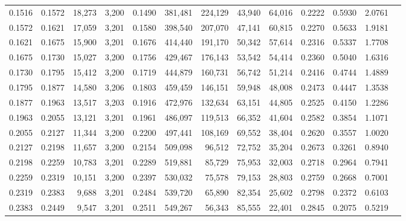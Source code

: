 \begin{tabular}{rrrrrrrrrrrrr}
0.1516 & 0.1572 & 18,273 & 3,200 &                                     0.1490 & 381,481 & 224,129 &  43,940 &  64,016 & 0.2222 & 0.5930 & 2.0761 \\
0.1572 & 0.1621 & 17,059 & 3,201 &                                     0.1580 & 398,540 & 207,070 &  47,141 &  60,815 & 0.2270 & 0.5633 & 1.9181 \\
0.1621 & 0.1675 & 15,900 & 3,201 &                                     0.1676 & 414,440 & 191,170 &  50,342 &  57,614 & 0.2316 & 0.5337 & 1.7708 \\
0.1675 & 0.1730 & 15,027 & 3,200 &                                     0.1756 & 429,467 & 176,143 &  53,542 &  54,414 & 0.2360 & 0.5040 & 1.6316 \\
0.1730 & 0.1795 & 15,412 & 3,200 &                                     0.1719 & 444,879 & 160,731 &  56,742 &  51,214 & 0.2416 & 0.4744 & 1.4889 \\
0.1795 & 0.1877 & 14,580 & 3,206 &                                     0.1803 & 459,459 & 146,151 &  59,948 &  48,008 & 0.2473 & 0.4447 & 1.3538 \\
0.1877 & 0.1963 & 13,517 & 3,203 &                                     0.1916 & 472,976 & 132,634 &  63,151 &  44,805 & 0.2525 & 0.4150 & 1.2286 \\
0.1963 & 0.2055 & 13,121 & 3,201 &                                     0.1961 & 486,097 & 119,513 &  66,352 &  41,604 & 0.2582 & 0.3854 & 1.1071 \\
0.2055 & 0.2127 & 11,344 & 3,200 &                                     0.2200 & 497,441 & 108,169 &  69,552 &  38,404 & 0.2620 & 0.3557 & 1.0020 \\
0.2127 & 0.2198 & 11,657 & 3,200 &                                     0.2154 & 509,098 &  96,512 &  72,752 &  35,204 & 0.2673 & 0.3261 & 0.8940 \\
0.2198 & 0.2259 & 10,783 & 3,201 &                                     0.2289 & 519,881 &  85,729 &  75,953 &  32,003 & 0.2718 & 0.2964 & 0.7941 \\
0.2259 & 0.2319 & 10,151 & 3,200 &                                     0.2397 & 530,032 &  75,578 &  79,153 &  28,803 & 0.2759 & 0.2668 & 0.7001 \\
0.2319 & 0.2383 &  9,688 & 3,201 &                                     0.2484 & 539,720 &  65,890 &  82,354 &  25,602 & 0.2798 & 0.2372 & 0.6103 \\
0.2383 & 0.2449 &  9,547 & 3,201 &                                     0.2511 & 549,267 &  56,343 &  85,555 &  22,401 & 0.2845 & 0.2075 & 0.5219 \\

\end{tabular}
